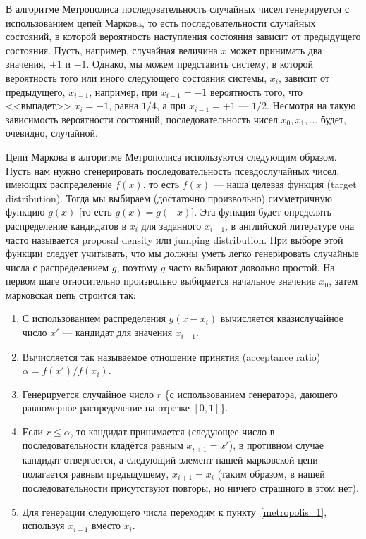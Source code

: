\documentclass{book}
\begin{document}
В алгоритме Метрополиса последовательность случайных чисел генерируется с использованием
цепей Марковa, то есть последовательности случайных состояний, в которой вероятность наступления
состояния зависит от предыдущего состояния. Пусть, например, случайная величина $x$ может принимать
два значения, $+1$ и $-1$. Однако, мы можем представить систему, в которой вероятность того или
иного следующего состояния
системы, $x_i$, зависит от предыдущего, $x_{i - 1}$, например, при $x_{i - 1} = -1$ вероятность
того, что <<выпадет>> $x_i = -1$, равна $1/4$, а при $x_{i - 1} = +1$ --- $1/2$. Несмотря на такую
зависимость вероятности состояний, последовательность
чисел $x_0, x_1,...$ будет, очевидно, случайной.

Цепи Маркова в алгоритме Метрополиса используются следующим образом. Пусть нам нужно сгенерировать
последовательность псевдослучайных чисел, имеющих распределение $f(x)$, то есть $f(x)$ --- наша
целевая функция (target distribution). Тогда мы выбираем (достаточно произвольно) симметричную
функцию $g(x)$ [то есть $g(x) = g(-x)$]. Эта функция будет определять распределение кандидатов в
$x_i$ для заданного $x_{i - 1}$, в английской литературе она часто называется proposal density или
jumping distribution. При выборе этой функции следует учитывать, что мы должны уметь легко
генерировать случайные числа с распределением $g$, поэтому $g$ часто выбирают довольно простой. На
первом шаге относительно произвольно выбирается начальное значение $x_0$, затем марковская цепь
строится так:
\begin{enumerate}
    \item \label{metropolis_1} С использованием распределения $g(x-x_i)$ вычисляется квазислучайное
        число $x'$ --- кандидат для значения $x_{i + 1}$.
    \item Вычисляется так называемое отношение принятия (acceptance ratio) $\alpha = f(x') / f(x_i)$.
    \item Генерируется случайное число $r$ \{с использованием генератора, дающего равномерное
        распределение на отрезке $[0, 1]$\}.
    \item \label{metropolis_acceptance} Если $r \leq \alpha$, то кандидат принимается (следующее
        число в последовательности кладётся равным $x_{i + 1} = x'$), в противном случае кандидат
        отвергается, а следующий элемент нашей марковской цепи полагается равным предыдущему, $x_{i
        + 1} = x_i$ (таким образом, в нашей последовательности присутствуют повторы, но ничего
        страшного в этом нет).
    \item Для генерации следующего числа переходим к пункту~\ref{metropolis_1}, используя $x_{i +
        1}$ вместо $x_i$.
\end{enumerate}
\end{document}
